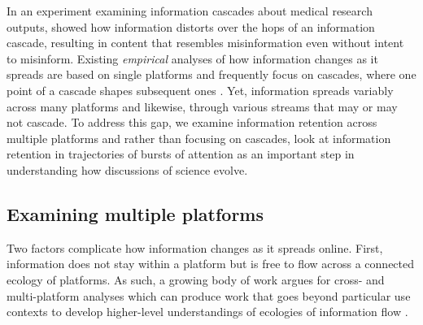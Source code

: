 \documentclass[letterpaper]{article} %
\begin{document}
In an experiment examining information cascades about medical research outputs, \citet{ribeiroMessageDistortionInformation2019} showed how information distorts over the hops of an information cascade, resulting in content that resembles misinformation even without intent to misinform. 
Existing \textit{empirical} analyses of how information changes as it spreads are based on single platforms and frequently focus on cascades, where one point of a cascade shapes subsequent ones \citep{easleyInformationCascades2010}. Yet, information spreads variably across many platforms and likewise, through various streams that may or may not cascade. To address this gap, we examine information retention across multiple platforms and rather than focusing on cascades, look at information retention in trajectories of bursts of attention as an important step in understanding how discussions of science evolve.


\subsection{Examining multiple platforms}
Two factors complicate how information changes as it spreads online. First, information does not stay within a platform but is free to flow across a connected ecology of platforms. As such, a growing body of work argues for cross- and multi-platform analyses which can produce work that goes beyond particular use contexts to develop higher-level understandings of ecologies of information flow \citep{hillStudyingPopulationsOnline2019,phadkeManyFacedHate2020,zakhlebinDiffusionScientificArticles2020,horvatBirdsFeatherFlock2021}.%
\end{document}
